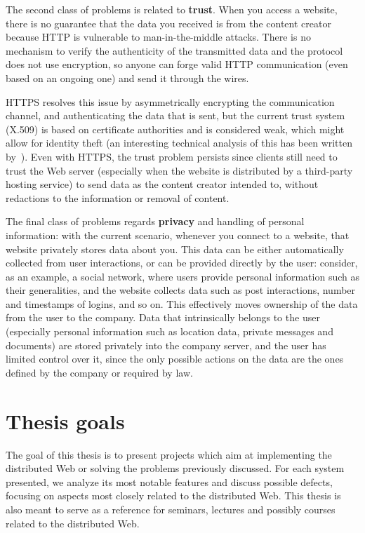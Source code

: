 \documentclass[mscthesis]{usiinfthesis}
\begin{document}
The second class of problems is related to \textbf{trust}. When you access a website, there is no guarantee that the data you received is from the content creator because HTTP is vulnerable to man-in-the-middle attacks. There is no mechanism to verify the authenticity of the transmitted data and the protocol does not use encryption, so anyone can forge valid HTTP communication (even based on an ongoing one) and send it through the wires.

HTTPS resolves this issue by asymmetrically encrypting the communication channel, and authenticating the data that is sent, but the current trust system (X.509) is based on certificate authorities and is considered weak, which might allow for identity theft (an interesting technical analysis of this has been written by~\cite{webarticle:httpssecurity}). Even with HTTPS, the trust problem persists since clients still need to trust the Web server (especially when the website is  distributed by a third-party hosting service) to send data as the content creator intended to, without redactions to the information or removal of content.

The final class of problems regards \textbf{privacy} and handling of personal information: with the current scenario, whenever you connect to a website, that website privately stores data about you.
This data can be either automatically collected from user interactions, or can be provided directly by the user: consider, as an example, a social network, where users provide personal information such as their generalities, and the website collects data such as post interactions, number and timestamps of logins, and so on.
This effectively moves ownership of the data from the user to the company. Data that intrinsically belongs to the user (especially personal information such as location data, private messages and documents) are stored privately into the company server, and the user has limited control over it, since the only possible actions on the data are the ones defined by the company or required by law.

\section{Thesis goals}
The goal of this thesis is to present projects which aim at implementing the distributed Web or solving the problems previously discussed. For each system presented, we analyze its most notable features and discuss possible defects, focusing on aspects most closely related to the distributed Web. This thesis is also meant to serve as a reference for seminars, lectures and possibly courses related to the distributed Web.
\end{document}
